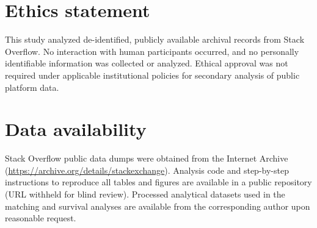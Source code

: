 \documentclass[preprint,12pt,authoryear]{elsarticle}
\begin{document}
\section*{Ethics statement}
This study analyzed de-identified, publicly available archival records from Stack Overflow. No interaction with human participants occurred, and no personally identifiable information was collected or analyzed. Ethical approval was not required under applicable institutional policies for secondary analysis of public platform data.

\section*{Data availability}
Stack Overflow public data dumps were obtained from the Internet Archive (\url{https://archive.org/details/stackexchange}). Analysis code and step-by-step instructions to reproduce all tables and figures are available in a public repository (URL withheld for blind review). Processed analytical datasets used in the matching and survival analyses are available from the corresponding author upon reasonable request.




\appendix

\end{document}

